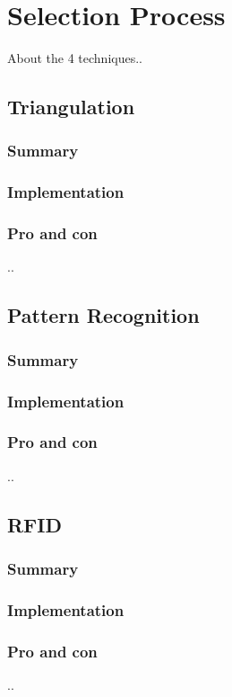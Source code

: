 \section{Selection Process} 

About the 4 techniques..

\subsection{Triangulation} %
\subsubsection*{Summary} 
\subsubsection*{Implementation}
\subsubsection*{Pro and con}
..

\subsection{Pattern Recognition} %
\subsubsection*{Summary} 
\subsubsection*{Implementation}
\subsubsection*{Pro and con}
..

\subsection{RFID} %
\subsubsection*{Summary} 
\subsubsection*{Implementation}
\subsubsection*{Pro and con}
..

